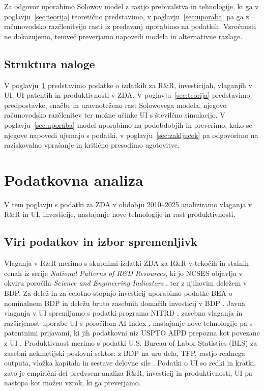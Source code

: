 \documentclass[12pt,a4paper]{article}
\begin{document}
Za odgovor uporabimo Solowov model z rastjo prebivalstva in tehnologije, ki ga v poglavju~\ref{sec:teorija} teoretično predstavimo, v poglavju~\ref{sec:uporaba} pa ga z računovodsko razčlenitvijo rasti iz predavanj uporabimo na podatkih. Vzročnosti ne dokazujemo, temveč preverjamo napovedi modela in alternativne razlage.

\subsection{Struktura naloge}
V poglavju~\ref{sec:podatki} predstavimo podatke o izdatkih za R\&R, investicijah, vlaganjih v UI, UI-patentih in produktivnosti v ZDA. V poglavju~\ref{sec:teorija} predstavimo predpostavke, enačbe in uravnoteženo rast Solowovega modela, njegovo računovodsko razčlenitev ter možne učinke UI s številčno simulacijo. V poglavju~\ref{sec:uporaba} model uporabimo na podobdobjih in preverimo, kako se njegove napovedi ujemajo s podatki, v poglavju~\ref{sec:zakljucek} pa odgovorimo na raziskovalno vprašanje in kritično presodimo ugotovitve.

\section{Podatkovna analiza}\label{sec:podatki}

V tem poglavju s podatki za ZDA v obdobju 2010--2025 analiziramo vlaganja v R\&R in UI, investicije, nastajanje nove tehnologije in rast produktivnosti.

\subsection{Viri podatkov in izbor spremenljivk}

Vlaganja v R\&R merimo s skupnimi izdatki ZDA za R\&R v tekočih in stalnih cenah iz serije \emph{National Patterns of R\&D Resources}, ki jo NCSES objavlja v okviru poročila \emph{Science and Engineering Indicators} \parencite[tab.~DISC-1]{nsb2025}, ter z njihovim deležem v BDP. Za delež in za celotno stopnjo investicij uporabimo podatke BEA o nominalnem BDP in deležu bruto zasebnih domačih investicij v BDP \parencites{fredgdp}{fredinv}. Javna vlaganja v UI spremljamo s podatki programa NITRD \parencites{nitrd2021}{nitrd2025}, zasebna vlaganja in razširjenost uporabe UI s poročilom AI Index \parencite{aiindex2025}, nastajanje nove tehnologije pa s patentnimi prijavami, ki jih podatkovni niz USPTO AIPD prepozna kot povezane z UI \parencite{pairolero2025}. Produktivnost merimo s podatki U.S. Bureau of Labor Statistics (BLS) za zasebni nekmetijski poslovni sektor: z BDP na uro dela, TFP, rastjo realnega outputa, vložka kapitala in sestave delovne sile \parencites{fredtfp}{bls2026tfp}. Podatki o UI so redki in kratki, zato je empirični del predvsem analiza R\&R, investicij in produktivnosti, UI pa nastopa kot možen vzrok, ki ga preverjamo.
\end{document}
